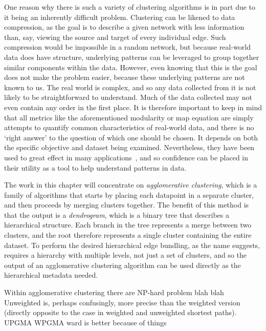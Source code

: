 One reason why there is such a variety of clustering algorithms is in part due to it being an inherently difficult problem.
Clustering can be likened to data compression, as the goal is to describe a given network with less information than, say, viewing the source and target of every individual edge. Such compression would be impossible in a random network, but because real-world data does have structure, underlying patterns can be leveraged to group together similar components within the data.
However, even knowing that this is the goal does not make the problem easier, because these underlying patterns are not known to us. The real world is complex, and so any data collected from it is not likely to be straightforward to understand. Much of the data collected may not even contain any order in the first place.
It is therefore important to keep in mind that all metrics like the aforementioned modularity or map equation are simply attempts to quantify common characteristics of real-world data, and there is no `right answer' to the question of which one should be chosen. It depends on both the specific objective and dataset being examined. Nevertheless, they have been used to great effect in many applications~\cite{TODO}, and so confidence can be placed in their utility as a tool to help understand patterns in data.

The work in this chapter will concentrate on \textit{agglomerative clustering}, which is a family of algorithms that starts by placing each datapoint in a separate cluster, and then proceeds by merging clusters together. 
The benefit of this method is that the output is a \textit{dendrogram}, which is a binary tree that describes a hierarchical structure. Each branch in the tree represents a merge between two clusters, and the root therefore represents a single cluster containing the entire dataset. To perform the desired hierarchical edge bundling, as the name suggests, requires a hierarchy with multiple levels, not just a set of clusters, and so the output of an agglomerative clustering algorithm can be used directly as the hierarchical metadata needed.

Within agglomerative clustering there are 
NP-hard problem blah blah
Unweighted is, perhaps confusingly, more precise than the weighted version (directly opposite to the case in weighted and unweighted shortest paths). 
UPGMA WPGMA ward is better because of things

